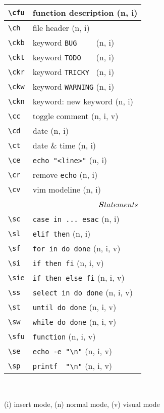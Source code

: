 \documentclass[oneside,12pt,a4paper,DIV18]{scrartcl}
\begin{document}
\begin{center}
\begin{tabular}[]{|p{11mm}|p{59mm}|}
\hline \verb'\cfu' & function description             \hfill (n, i) \\
\hline \verb'\ch'  & file header                      \hfill (n, i) \\
\hline \verb'\ckb' & keyword \verb'BUG    '           \hfill (n, i) \\
\hline \verb'\ckt' & keyword \verb'TODO   '           \hfill (n, i) \\
\hline \verb'\ckr' & keyword \verb'TRICKY '           \hfill (n, i) \\
\hline \verb'\ckw' & keyword \verb'WARNING'           \hfill (n, i) \\
\hline \verb'\ckn' & keyword: new keyword             \hfill (n, i) \\
\hline \verb'\cc'  & toggle comment                   \hfill (n, i, v) \\
\hline \verb'\cd'  & date                             \hfill (n, i) \\
\hline \verb'\ct'  & date \& time                     \hfill (n, i) \\
\hline \verb'\ce'  & \verb'echo "<line>"'             \hfill (n, i) \\
\hline \verb'\cr'  & remove \verb'echo'               \hfill (n, i) \\
\hline \verb'\cv'  & vim modeline                     \hfill (n, i) \\
\hline
\hline 
\hline
\multicolumn{2}{|r|}{\textsl{\textbf{S}tatements}} \\
\hline \verb'\sc'  & \verb'case in ... esac'    \hfill (n, i) \\
\hline \verb'\sl'  & \verb'elif then'           \hfill (n, i) \\
\hline \verb'\sf'  & \verb'for in do done'      \hfill (n, i, v) \\
\hline \verb'\si'  & \verb'if then fi'          \hfill (n, i, v) \\
\hline \verb'\sie' & \verb'if then else fi'     \hfill (n, i, v) \\
\hline \verb'\ss'  & \verb'select in do done'   \hfill (n, i, v) \\
\hline \verb'\st'  & \verb'until do done'       \hfill (n, i, v) \\
\hline \verb'\sw'  & \verb'while do done'       \hfill (n, i, v) \\
\hline \verb'\sfu' & \verb'function'            \hfill (n, i, v) \\
\hline \verb'\se'  & \verb'echo -e "\n"'        \hfill (n, i, v) \\
\hline \verb'\sp'  & \verb'printf  "\n"'        \hfill (n, i, v) \\
\hline
\end{tabular} \\
\begin{flushleft}
{\small
{\normalsize (i)} insert mode, {\normalsize (n)} normal mode, {\normalsize (v)} visual mode
}%
\end{flushleft}


\end{center}
\end{document}
